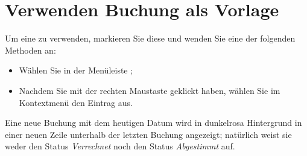 \section{Verwenden Buchung als Vorlage\label{transactions-model}}

Um eine  zu verwenden, markieren Sie diese und wenden Sie eine der folgenden Methoden an:
\begin{itemize}
	\item Wählen Sie in der Menüleiste ;
	\item Nachdem Sie mit der rechten Maustaste geklickt haben, wählen Sie im Kontextmenü den Eintrag  aus.
\end{itemize}

Eine neue Buchung mit dem heutigen Datum wird in {\setlength{\fboxsep}{2pt}\colorbox[RGB]{245,155,155}{dunkelrosa Hintergrund}} in einer neuen Zeile unterhalb der letzten Buchung angezeigt; natürlich weist sie weder den Status \emph{Verrechnet} noch den Status \emph{Abgestimmt} auf.

